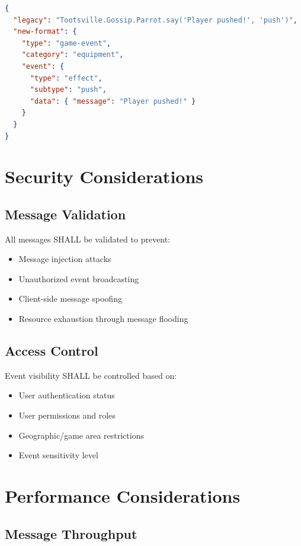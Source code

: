 \documentclass[12pt,a4paper]{article}
\begin{document}
\begin{lstlisting}[language=JSON, caption=Legacy Message Mapping]
{
  "legacy": "Tootsville.Gossip.Parrot.say('Player pushed!', 'push')",
  "new-format": {
    "type": "game-event",
    "category": "equipment",
    "event": {
      "type": "effect",
      "subtype": "push",
      "data": { "message": "Player pushed!" }
    }
  }
}
\end{lstlisting}

\section{Security Considerations}

\subsection{Message Validation}

All messages SHALL be validated to prevent:

\begin{itemize}
\item Message injection attacks
\item Unauthorized event broadcasting
\item Client-side message spoofing
\item Resource exhaustion through message flooding
\end{itemize}

\subsection{Access Control}

Event visibility SHALL be controlled based on:

\begin{itemize}
\item User authentication status
\item User permissions and roles
\item Geographic/game area restrictions
\item Event sensitivity level
\end{itemize}

\section{Performance Considerations}

\subsection{Message Throughput}
\end{document}
